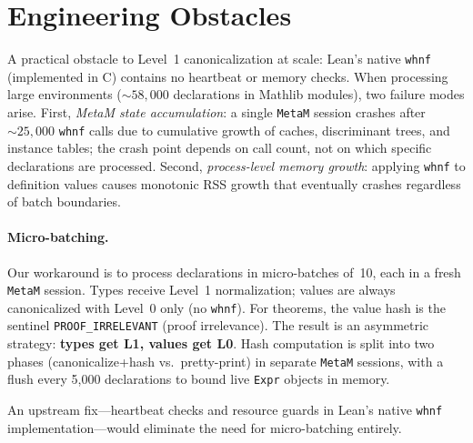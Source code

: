 \appendix
\section{Engineering Obstacles}
\label{app:engineering}

A practical obstacle to Level~1 canonicalization at scale: Lean's native
\texttt{whnf} (implemented in C) contains no heartbeat or memory
checks.  When processing large environments (${\sim}58{,}000$
declarations in Mathlib modules), two failure modes arise.  First,
\emph{MetaM state accumulation}: a single \texttt{MetaM} session
crashes after ${\sim}25{,}000$ \texttt{whnf} calls due to cumulative
growth of caches, discriminant trees, and instance tables; the crash
point depends on call count, not on which specific declarations are
processed.  Second, \emph{process-level memory growth}: applying
\texttt{whnf} to definition values causes monotonic RSS growth that
eventually crashes regardless of batch boundaries.

\paragraph{Micro-batching.}  Our workaround is to process declarations
in micro-batches of~10, each in a fresh \texttt{MetaM} session.  Types
receive Level~1 normalization; values are always canonicalized with
Level~0 only (no \texttt{whnf}).  For theorems, the value hash is the
sentinel \texttt{PROOF\_IRRELEVANT} (proof irrelevance).  The result is
an asymmetric strategy: \textbf{types get L1, values get L0}.  Hash
computation is split into two phases (canonicalize+hash vs.\
pretty-print) in separate \texttt{MetaM} sessions, with a flush every
5{,}000 declarations to bound live \texttt{Expr} objects in memory.

An upstream fix---heartbeat checks and resource guards in Lean's native
\texttt{whnf} implementation---would eliminate the need for
micro-batching entirely.


